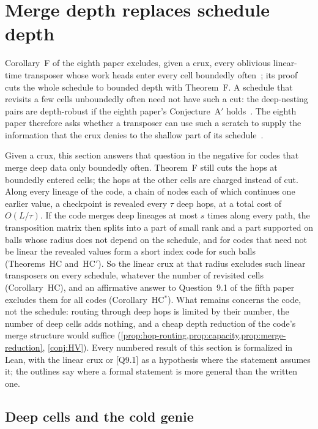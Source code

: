 \section{Merge depth replaces schedule depth}\label{sec:hop}

Corollary~F of the eighth paper excludes, given a crux, every oblivious linear-time transposer whose work heads enter
every cell boundedly often~\cite[Corollary~6.1]{BoundedNesting2026}; its proof cuts the whole schedule to bounded depth
with Theorem~F. A schedule that revisits a few cells unboundedly often need not have such a cut: the deep-nesting pairs
are depth-robust if the eighth paper's Conjecture~A$'$ holds~\cite[Corollary~5.26]{BoundedNesting2026}. The eighth paper
therefore asks whether a transposer can use such a scratch to supply the information that the crux denies to the
shallow part of its schedule~\cite[Problem~10.5]{BoundedNesting2026}.

Given a crux, this section answers that question in the negative for codes that merge deep data only boundedly often.
Theorem~F still cuts the hops at boundedly entered cells; the hops at the other cells are charged instead of cut. Along
every lineage of the code, a chain of nodes each of which continues one earlier value, a checkpoint is revealed every
$\tau$ deep hops, at a total cost of $O(L/\tau)$. If the code merges deep lineages at most $s$ times along every path,
the transposition matrix then splits into a part of small rank and a part supported on balls whose radius does not
depend on the schedule, and for codes that need not be linear the revealed values form a short index code for such
balls (Theorems~HC and~HC$'$). So the linear crux at that radius excludes such linear transposers on every schedule,
whatever the number of revisited cells (Corollary~HC), and an affirmative answer to Question~9.1 of the fifth paper
excludes them for all codes (Corollary~HC$^*$). What remains concerns the code, not the schedule: routing through deep
hops is limited by their number, the number of deep cells adds nothing, and a cheap depth reduction of the code's merge
structure would suffice (\cref{prop:hop-routing,prop:capacity,prop:merge-reduction}, \cref{conj:HV}). Every numbered
result of this section is formalized in Lean, with the linear crux or [Q9.1] as a hypothesis where the statement assumes
it; the outlines say where a formal statement is more general than the written one.

\subsection{Deep cells and the cold genie}\label{sec:hop-cold}

